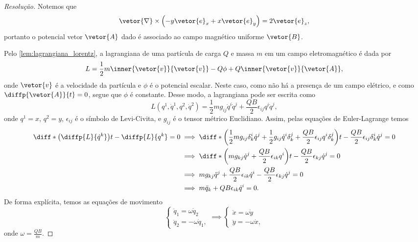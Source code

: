 \begin{proof}[Resolução]
    Notemos que
    \begin{equation*}
        \vetor{\nabla} \times \left(- y\vetor{e}_x + x\vetor{e}_y\right) = 2 \vetor{e}_z,
    \end{equation*}
    portanto o potencial vetor \(\vetor{A}\) dado é associado ao campo magnético uniforme \(\vetor{B}\).

    Pelo \cref{lem:lagrangiana_lorentz}, a lagrangiana de uma partícula de carga \(Q\) e massa \(m\) em um campo eletromagnético é dada por
    \begin{equation*}
    L = \frac12 m\inner{\vetor{v}}{\vetor{v}} - Q\phi + Q \inner{\vetor{v}}{\vetor{A}},
    \end{equation*}
    onde \(\vetor{v}\) é a velocidade da partícula e \(\phi\) é o potencial escalar. Neste caso, como não há a presença de um campo elétrico, e como \(\diffp{\vetor{A}}{t} = 0\), segue que \(\phi\) é constante. Desse modo, a lagrangiana pode ser escrita como
    \begin{equation*}
        L(q^1,\dot{q}^1, q^2, \dot{q}^2) = \frac12 m g_{ij}\dot{q}^i \dot{q}^j + \frac{QB}{2} \epsilon_{ij}q^i\dot{q}^j,
    \end{equation*}
    onde \(q^1 = x\), \(q^2 = y\), \(\epsilon_{ij}\) é o símbolo de Levi-Civita, e \(g_{ij}\) é o tensor métrico Euclidiano. Assim, pelas equações de Euler-Lagrange temos
    \begin{align*}
        \diff*{\left(\diffp{L}{\dot{q}^k}\right)}{t} - \diffp{L}{q^k} = 0 &\implies \diff*{\left(\frac12 mg_{ij} \delta^i_k \dot{q}^j + \frac12 g_{ij} \dot{q}^i\delta^j_k + \frac{QB}{2}\epsilon_{ij} q^i \delta^j_k\right)}{t} - \frac{QB}{2} \epsilon_{ij}\delta^i_k \dot{q}^j = 0\\
                                                                          &\implies \diff*{\left(mg_{kj} \dot{q}^j + \frac{QB}{2}\epsilon_{ik} q^i \right)}{t} - \frac{QB}{2} \epsilon_{kj}\dot{q}^j = 0\\
                                                                          &\implies mg_{kj} \ddot{q}^j + \frac{QB}{2}\epsilon_{ik} \dot{q}^i - \frac{QB}{2} \epsilon_{kj}\dot{q}^j = 0\\
                                                                          &\implies m\ddot{q}_k + QB\epsilon_{ik} \dot{q}^i = 0.
    \end{align*}
    De forma explícita, temos as equações de movimento
    \begin{equation*}
        \begin{cases}
            \ddot{q}_1 = \omega\dot{q}_2\\
            \ddot{q}_2 = -\omega\dot{q}_1,
        \end{cases} \implies
        \begin{cases}
            \ddot{x} = \omega\dot{y}\\
            \ddot{y} = -\omega\dot{x},
        \end{cases}
    \end{equation*}
    onde \(\omega = \frac{QB}{m}\).


\end{proof}
